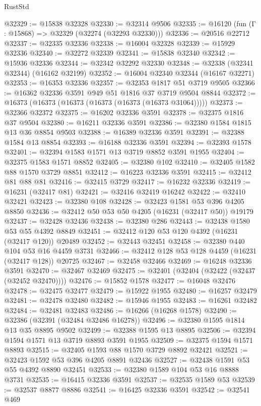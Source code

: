 \begin{lexlean}{RustStd}
\begin{coremodule}
@32329 := @15838 @32328
@32330 := @32314 @9506
@32335 := @16120 (fun (Γ : @15868) => @32329 (@32274 (@32293 @32330)))
@32336 := @20516 @22712
@32337 := @32335 @32336
@32338 := @16004 @32328
@32339 := @15929 @32336
@32340 := @32272 @32339
@32341 := @15838 @32340
@32342 := @15936 @32336
@32344 := @32342 @32292 @32330
@32348 := @32338 (@32341 @32344) (@16162 @32199)
@32352 := @16004 @32340 @32344 (@16167 @32271)
@32353 := @16353 @32336
@32357 := @32353 @1817 @51 @3719 @9505
@32366 := @16362 @32336 @3591 @949 @51 @1816 @37 @3719 @9504 @8844
@32372 := @16373 (@16373 (@16373 (@16373 (@16373 (@16373 @31064)))))
@32373 := @32366 @32372
@32375 := @16202 @32336 @3591
@32378 := @32375 @1816 @37 @9504
@32380 := @16211 @32336 @3591
@32386 := @32380 @1584 @1815 @13 @36 @8854 @9503
@32388 := @16389 @32336 @3591
@32391 := @32388 @1584 @13 @8854
@32393 := @16188 @32336 @3591
@32394 := @32393 @1578
@32401 := @32394 @1583 @1571 @13 @3719 @8852 @3591 @1955
@32404 := @32375 @1583 @1571 @8852
@32405 := @32380 @102
@32410 := @32405 @1582 @88 @1570 @3729 @8851
@32412 := @16223 @32336 @3591
@32415 := @32412 @81 @88 @81
@32416 := @32415 @3729
@32417 := @16232 @32336
@32419 := @16231 (@32417 @81)
@32421 := @32416 @32419 @16242
@32422 := @32410 @32421
@32423 := @32380 @108
@32428 := @32423 @1581 @53 @396 @4205 @8850
@32436 := @32412 @50 @53 @50 @4205 (@16231 (@32417 @50)) @19179
@32437 := @32428 @32436
@32438 := @32380 @286
@32443 := @32438 @1580 @53 @55 @4392 @8849
@32451 := @32412 @120 @53 @120 @4392 (@16231 (@32417 @120)) @20489
@32452 := @32443 @32451
@32458 := @32380 @440 @104 @53 @16 @4459 @3731
@32466 := @32412 @128 @53 @128 @4459 (@16231 (@32417 @128)) @20725
@32467 := @32458 @32466
@32469 := @16248 @32336 @3591
@32470 := @32467 @32469
@32475 := @32401 (@32404 (@32422 (@32437 (@32452 @32470))))
@32476 := @15852 @1578
@32477 := @16048 @32476
@32478 := @32475 @32477
@32479 := @15922 @1955
@32480 := @16257 @32479
@32481 := @32478 @32480
@32482 := @15946 @1955
@32483 := @16261 @32482
@32484 := @32481 @32483
@32486 := @16266 (@16268 @1578)
@32490 := @32386 (@32391 (@32484 @32486 @16278))
@32496 := @32380 @1595 @1814 @13 @35 @8895 @9502
@32499 := @32388 @1595 @13 @8895
@32506 := @32394 @1594 @1571 @13 @3719 @8893 @3591 @1955
@32509 := @32375 @1594 @1571 @8893
@32515 := @32405 @1593 @88 @1570 @3729 @8892 @32421
@32521 := @32423 @1592 @53 @396 @4205 @8891 @32436
@32527 := @32438 @1591 @53 @55 @4392 @8890 @32451
@32533 := @32380 @1589 @104 @53 @16 @8888 @3731
@32535 := @16415 @32336 @3591
@32537 := @32535 @1589 @53
@32539 := @32537 @8877 @8886
@32541 := @16425 @32336 @3591
@32542 := @32541 @469

\end{coremodule}
\end{lexlean}
